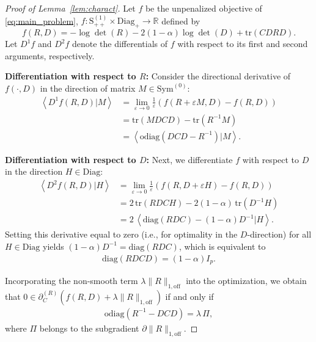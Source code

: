 \documentclass[12pt]{amsart}
\numberwithin{equation}{section}
\numberwithin{equation}{section}
\theoremstyle{plain}
\theoremstyle{definition}
\newcommand{\tr}{\mathrm{tr}}
\newcommand{\diag}[1]{\mathrm{diag}(#1)}
\newcommand{\odiag}[1]{\mathrm{odiag}(#1)}
\newcommand{\Sppone}{\mathrm{S}_{++}^{(1)}}
\newcommand{\Szero}{\mathrm{Sym}^{(0)}}
\newcommand{\R}{\mathbb{R}}
\newcommand{\Diag}{\mathrm{Diag}}
\newcommand{\Diagp}{\mathrm{Diag}_+}
\begin{document}
\begin{proof}[Proof of Lemma~\ref{lem:charact}]
Let $f$ be the unpenalized objective of \eqref{eq:main_problem}, $f\colon \Sppone\times\Diagp\to \R$ defined by
\[  
f(R,D) = -\log\det(R)-2(1-\alpha)\log \det(D) + \tr(C D R D).
\]  
Let $D^1 f$ and $D^2f$ denote the differentials of $f$ with respect to its first and second arguments, respectively. 

\textbf{Differentiation with respect to $R$:} 
Consider the directional derivative of $f(\cdot, D)$  in the direction of matrix $M\in\Szero$:
\begin{align*}
\left< D^{1} f(R,D)| M\right> &= \lim_{\varepsilon\to 0} \frac{1}{\varepsilon}(f(R+\varepsilon M,D)-f(R,D)) \\
&=\tr(M DC D)-\tr(R^{-1} M)\\
&= \left< \odiag{DC D -R^{-1}}|M\right>.
\end{align*}

\textbf{Differentiation with respect to $D$:} 
Next, we differentiate $f$ with respect to $D$ in the direction $H \in \Diag$:
\begin{align*}
\left< D^{2} f(R,D)| H\right> & = \lim_{\varepsilon\to 0} \frac{1}{\varepsilon}(f(R,D+\varepsilon H)-f(R,D)) \\
&=  2\,\tr(R D C H) - 2(1-\alpha)\, \tr(D^{-1} H)\\
&= 2\, \left< \diag{R D C}-(1-\alpha) D^{-1}|H\right>.
\end{align*}
Setting this derivative equal to zero (i.e., for optimality in the $D$-direction) for all $H \in \Diag$ yields
$(1-\alpha)D^{-1}=\diag{R D C}$, which is equivalent to  
\begin{align}\label{eq:diffD}
\diag{R D C D}= (1-\alpha)I_p.
\end{align}


Incorporating the non-smooth term $\lambda \|R\|_{1,\mathrm{off}}$ into the optimization, we obtain that
 $0\in\partial_C^{(R)}  \left(f(R, D)+\lambda\|R\|_{1,\mathrm{off}} \right)$  if and only if
\begin{align}\label{eq:diffR}
\odiag{R^{-1}-D C D} = \lambda\, \Pi,
\end{align}
where $\Pi$ belongs to the subgradient  $\partial \|R\|_{1,\mathrm{off}}$. 


\end{proof}
\end{document}
